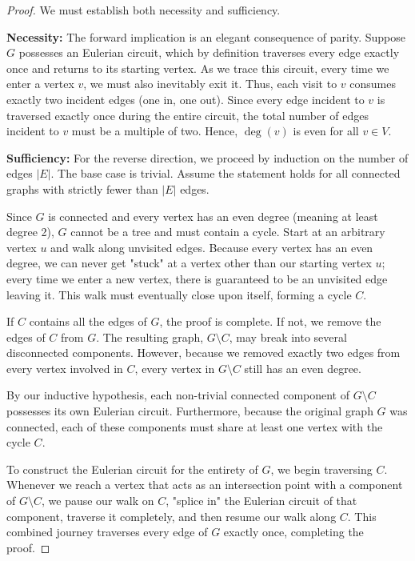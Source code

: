 \documentclass[11pt]{scrartcl}
\begin{document}
\begin{proof}
    We must establish both necessity and sufficiency. 
    
    \textbf{Necessity:} The forward implication is an elegant consequence of parity. Suppose $G$ possesses an Eulerian circuit, which by definition traverses every edge exactly once and returns to its starting vertex. As we trace this circuit, every time we enter a vertex $v$, we must also inevitably exit it. Thus, each visit to $v$ consumes exactly two incident edges (one in, one out). Since every edge incident to $v$ is traversed exactly once during the entire circuit, the total number of edges incident to $v$ must be a multiple of two. Hence, $\deg(v)$ is even for all $v \in V$.

    \textbf{Sufficiency:} For the reverse direction, we proceed by induction on the number of edges $|E|$. The base case is trivial. Assume the statement holds for all connected graphs with strictly fewer than $|E|$ edges. 
    
    Since $G$ is connected and every vertex has an even degree (meaning at least degree 2), $G$ cannot be a tree and must contain a cycle. Start at an arbitrary vertex $u$ and walk along unvisited edges. Because every vertex has an even degree, we can never get "stuck" at a vertex other than our starting vertex $u$; every time we enter a new vertex, there is guaranteed to be an unvisited edge leaving it. This walk must eventually close upon itself, forming a cycle $C$.
    
    If $C$ contains all the edges of $G$, the proof is complete. If not, we remove the edges of $C$ from $G$. The resulting graph, $G \setminus C$, may break into several disconnected components. However, because we removed exactly two edges from every vertex involved in $C$, every vertex in $G \setminus C$ still has an even degree. 
    
    By our inductive hypothesis, each non-trivial connected component of $G \setminus C$ possesses its own Eulerian circuit. Furthermore, because the original graph $G$ was connected, each of these components must share at least one vertex with the cycle $C$. 
    
    
    To construct the Eulerian circuit for the entirety of $G$, we begin traversing $C$. Whenever we reach a vertex that acts as an intersection point with a component of $G \setminus C$, we pause our walk on $C$, "splice in" the Eulerian circuit of that component, traverse it completely, and then resume our walk along $C$. This combined journey traverses every edge of $G$ exactly once, completing the proof.
\end{proof}
\end{document}
